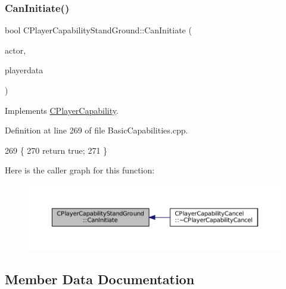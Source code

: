 \subsubsection{\texorpdfstring{Can\+Initiate()}{CanInitiate()}}
{\footnotesize\ttfamily bool C\+Player\+Capability\+Stand\+Ground\+::\+Can\+Initiate (\begin{DoxyParamCaption}\item[{std\+::shared\+\_\+ptr$<$ \hyperlink{classCPlayerAsset}{C\+Player\+Asset} $>$}]{actor,  }\item[{std\+::shared\+\_\+ptr$<$ \hyperlink{classCPlayerData}{C\+Player\+Data} $>$}]{playerdata }\end{DoxyParamCaption})\hspace{0.3cm}{\ttfamily [virtual]}}



Implements \hyperlink{classCPlayerCapability_aa83b1e1fcaff2985c378132d679154ea}{C\+Player\+Capability}.



Definition at line 269 of file Basic\+Capabilities.\+cpp.


\begin{DoxyCode}
269                                                                                                            
                     \{
270     \textcolor{keywordflow}{return} \textcolor{keyword}{true};
271 \}
\end{DoxyCode}
Here is the caller graph for this function\+:
\nopagebreak
\begin{figure}[H]
\begin{center}
\leavevmode
\includegraphics[width=350pt]{classCPlayerCapabilityStandGround_a5567bfa47166f4080bd2b86f5c33e29c_icgraph}
\end{center}
\end{figure}


\subsection{Member Data Documentation}
\hypertarget{classCPlayerCapabilityStandGround_a7e89ffa413cea60b2f3c923fe5f44201}{}\label{classCPlayerCapabilityStandGround_a7e89ffa413cea60b2f3c923fe5f44201} 
